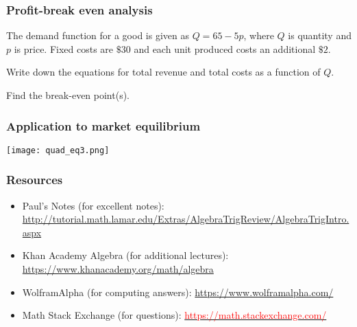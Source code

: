 \documentclass[xcolor=dvipsnames, 9pt]{beamer} %
\begin{document}
\begin{frame}
\frametitle{Profit-break even analysis}
The demand function for a good is given as $Q = 65 - 5p$, where $Q$ is quantity and $p$ is price. Fixed costs are $\$30$ and each unit produced costs an additional $\$2$.

\vspace{1em}

Write down the equations for total revenue and total costs as a function of $Q$.

\vspace{1em}

Find the break-even point(s). 
\end{frame}

\begin{frame}
\frametitle{Application to market equilibrium}
\hspace{0.5cm} \texttt{[image: quad\_eq3.png]}
\end{frame}

\begin{frame}
\frametitle{Resources}
\begin{small}
\begin{itemize}
\item Paul's Notes (for excellent notes): \href{http://tutorial.math.lamar.edu/Extras/AlgebraTrigReview/AlgebraTrigIntro.aspx}{\textcolor{dark_red}{http://tutorial.math.lamar.edu/Extras/AlgebraTrigReview/AlgebraTrigIntro.aspx}}
\item Khan Academy Algebra (for additional lectures): \href{https://www.khanacademy.org/math/algebra}{\textcolor{dark_red}{https://www.khanacademy.org/math/algebra}}
\item WolframAlpha (for computing answers): \href{https://www.wolframalpha.com/}{\textcolor{dark_red}{https://www.wolframalpha.com/}}
\item Math Stack Exchange (for questions): \href{https://math.stackexchange.com/}{\textcolor{red}{https://math.stackexchange.com/}}
\end{itemize}
\end{small}
\end{frame}
\end{document}
